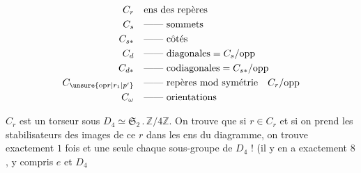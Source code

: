 \[
\begin{aligned}
C_r&\quad\text{ens des repères}\\
C_s&\quad\text{------ sommets}\\
C_{s*}&\quad\text{------ côtés}\\
C_d&\quad\text{------ diagonales}=C_s/\mathrm{opp}\\
C_{d*}&\quad\text{------ codiagonales}=C_{s*}/\mathrm{opp}\\
C_{\unsure{\mathrm{op}r|r_1|p'}}&\quad\text{------ repères mod symétrie}\quad C_r/\mathrm{opp}\\
C_\omega&\quad\text{------ orientations}
\end{aligned}
\]


$C_r$ est un torseur sous $D_4\simeq\mathfrak S_2\mathbin{.}\mathbb Z/4\mathbb Z$. On trouve que si $r\in C_r$ et si on prend les stabilisateurs des images de ce $r$ dans les ens du diagramme, on trouve exactement $1$ fois et une seule chaque sous-groupe de $D_4$ ! (il y en a exactement $8$, y compris $e$ et $D_4$

